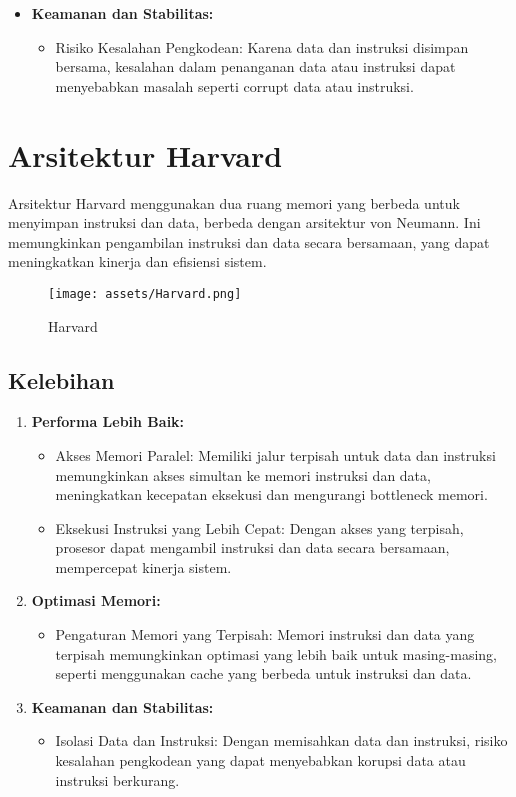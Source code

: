 \documentclass{article}
\begin{document}
\begin{enumerate}[label=\arabic*.]
\begin{itemize}
    \item \textbf{Keamanan dan Stabilitas:}
    \begin{itemize}
      \item Risiko Kesalahan Pengkodean: Karena data dan instruksi disimpan bersama, kesalahan dalam penanganan data atau instruksi dapat menyebabkan masalah seperti corrupt data atau instruksi.
    \end{itemize}
  \end{itemize}
\end{enumerate}

\section{Arsitektur Harvard}

Arsitektur Harvard menggunakan dua ruang memori yang berbeda untuk menyimpan instruksi dan data, berbeda dengan arsitektur von Neumann. Ini memungkinkan pengambilan instruksi dan data secara bersamaan, yang dapat meningkatkan kinerja dan efisiensi sistem.
\begin{figure}
    \centering
    \texttt{[image: assets/Harvard.png]}
    \caption{Harvard}
    \label{fig:enter-label}
\end{figure}
\subsection{Kelebihan}

\begin{enumerate}[label=\arabic*.]
  \item \textbf{Performa Lebih Baik:}
  \begin{itemize}
    \item Akses Memori Paralel: Memiliki jalur terpisah untuk data dan instruksi memungkinkan akses simultan ke memori instruksi dan data, meningkatkan kecepatan eksekusi dan mengurangi bottleneck memori.
    \item Eksekusi Instruksi yang Lebih Cepat: Dengan akses yang terpisah, prosesor dapat mengambil instruksi dan data secara bersamaan, mempercepat kinerja sistem.
  \end{itemize}
  
  \item \textbf{Optimasi Memori:}
  \begin{itemize}
    \item Pengaturan Memori yang Terpisah: Memori instruksi dan data yang terpisah memungkinkan optimasi yang lebih baik untuk masing-masing, seperti menggunakan cache yang berbeda untuk instruksi dan data.
  \end{itemize}
  
  \item \textbf{Keamanan dan Stabilitas:}
  \begin{itemize}
    \item Isolasi Data dan Instruksi: Dengan memisahkan data dan instruksi, risiko kesalahan pengkodean yang dapat menyebabkan korupsi data atau instruksi berkurang.
  \end{itemize}
\end{enumerate}
\end{document}
